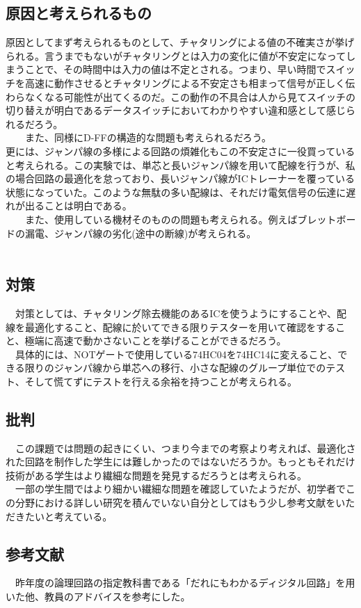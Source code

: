 \documentclass{scrartcl}
\begin{document}
\subsection{原因と考えられるもの}
\label{sec:org494d8f3}

    原因としてまず考えられるものとして、チャタリングによる値の不確実さが挙げられる。言うまでもないがチャタリングとは入力の変化に値が不安定になってしまうことで、その時間中は入力の値は不定とされる。つまり、早い時間でスイッチを高速に動作させるとチャタリングによる不安定さも相まって信号が正しく伝わらなくなる可能性が出てくるのだ。この動作の不具合は人から見てスイッチの切り替えが明白であるデータスイッチにおいてわかりやすい違和感として感じられるだろう。\\
　　また、同様にD-FFの構造的な問題も考えられるだろう。\\
    更には、ジャンパ線の多様による回路の煩雑化もこの不安定さに一役買っていると考えられる。この実験では、単芯と長いジャンパ線を用いて配線を行うが、私の場合回路の最適化を怠っており、長いジャンパ線がICトレーナーを覆っている状態になっていた。このような無駄の多い配線は、それだけ電気信号の伝達に遅れが出ることは明白である。\\
　　また、使用している機材そのものの問題も考えられる。例えばブレットボードの漏電、ジャンパ線の劣化(途中の断線)が考えられる。\\
　　\\

\subsection{対策}
\label{sec:org63fbeee}

　対策としては、チャタリング除去機能のあるICを使うようにすることや、配線を最適化すること、配線に於いてできる限りテスターを用いて確認をすること、極端に高速で動かさないことを挙げることができるだろう。\\
　具体的には、NOTゲートで使用している74HC04を74HC14に変えること、できる限りのジャンパ線から単芯への移行、小さな配線のグループ単位でのテスト、そして慌てずにテストを行える余裕を持つことが考えられる。\\
\subsection{批判}
　この課題では問題の起きにくい、つまり今までの考察より考えれば、最適化された回路を制作した学生には難しかったのではないだろうか。もっともそれだけ技術がある学生はより繊細な問題を発見するだろうとは考えられる。\\
　一部の学生間ではより細かい繊細な問題を確認していたようだが、初学者でこの分野における詳しい研究を積んでいない自分としてはもう少し参考文献をいただきたいと考えている。
\subsection{参考文献}
　昨年度の論理回路の指定教科書である「だれにもわかるディジタル回路」を用いた他、教員のアドバイスを参考にした。
\end{document}
